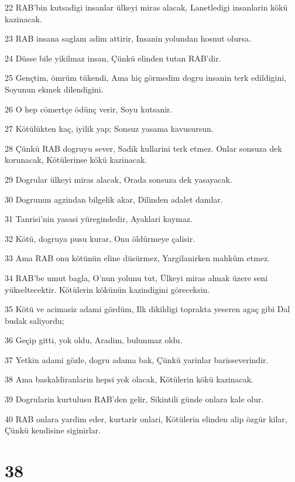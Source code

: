 \par 22 RAB'bin kutsadigi insanlar ülkeyi miras alacak, Lanetledigi insanlarin kökü kazinacak.
\par 23 RAB insana saglam adim attirir, Insanin yolundan hosnut olursa.
\par 24 Düsse bile yikilmaz insan, Çünkü elinden tutan RAB'dir.
\par 25 Gençtim, ömrüm tükendi, Ama hiç görmedim dogru insanin terk edildigini, Soyunun ekmek dilendigini.
\par 26 O hep cömertçe ödünç verir, Soyu kutsanir.
\par 27 Kötülükten kaç, iyilik yap; Sonsuz yasama kavusursun.
\par 28 Çünkü RAB dogruyu sever, Sadik kullarini terk etmez. Onlar sonsuza dek korunacak, Kötülerinse kökü kazinacak.
\par 29 Dogrular ülkeyi miras alacak, Orada sonsuza dek yasayacak.
\par 30 Dogrunun agzindan bilgelik akar, Dilinden adalet damlar.
\par 31 Tanrisi'nin yasasi yüregindedir, Ayaklari kaymaz.
\par 32 Kötü, dogruya pusu kurar, Onu öldürmeye çalisir.
\par 33 Ama RAB onu kötünün eline düsürmez, Yargilanirken mahkûm etmez.
\par 34 RAB'be umut bagla, O'nun yolunu tut, Ülkeyi miras almak üzere seni yükseltecektir. Kötülerin kökünün kazindigini göreceksin.
\par 35 Kötü ve acimasiz adami gördüm, Ilk dikildigi toprakta yeseren agaç gibi Dal budak saliyordu;
\par 36 Geçip gitti, yok oldu, Aradim, bulunmaz oldu.
\par 37 Yetkin adami gözle, dogru adama bak, Çünkü yarinlar barisseverindir.
\par 38 Ama baskaldiranlarin hepsi yok olacak, Kötülerin kökü kazinacak.
\par 39 Dogrularin kurtulusu RAB'den gelir, Sikintili günde onlara kale olur.
\par 40 RAB onlara yardim eder, kurtarir onlari, Kötülerin elinden alip özgür kilar, Çünkü kendisine siginirlar.

\chapter{38}

